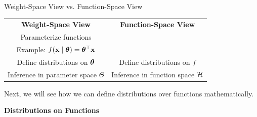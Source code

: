 \begin{frame}[c]{Weight-Space View vs. Function-Space View}

\begin{table}
  \begin{tabular}{cc}
  \textbf{Weight-Space View} & \textbf{Function-Space View} \vspace{4mm}\\ 
  Parameterize functions & \vspace{1mm}\\
  \footnotesize Example: $f(\mathbf{x}\mid\bm{\theta}) = \bm{\theta}^\top\mathbf{x}$ & \vspace{4mm}\\
  Define distributions on $\bm{\theta}$ & Define distributions on $f$ \vspace{4mm}\\
  Inference in parameter space $\Theta$ & Inference in function space $\mathcal{H}$
  \end{tabular}
\end{table}  

\lz
\lz

Next, we will see how we can define distributions over functions mathematically. 


\end{frame}

\begin{frame}[c]{}
\centering
\huge
\textbf{Distributions on Functions}
\end{frame}



